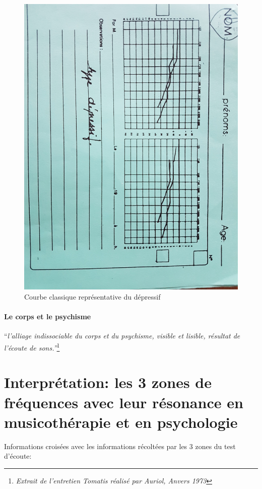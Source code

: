   \begin{figure}
	\centering
	\includegraphics[width=0.7\linewidth]{images/courbedepressif.jpg}
	\caption[Exemple d'une courbe de dépressif]{Courbe classique représentative du dépressif}
       
	\label{groupecontroleimage1}
\end{figure}




  

\paragraph{Le corps et le psychisme}

``\emph{l'alliage indissociable du corps et du psychisme, 
visible et lisible, résultat de l'écoute de sons.''}\footnote{\emph{Extrait de l'entretien Tomatis réalisé par Auriol, Anvers 1973}}



\section{Interprétation: les 3 zones de fréquences avec leur résonance en musicothérapie et en
  psychologie}


	Informations croisées avec les informations récoltées par les 3 
          zones du test d'écoute:
          
